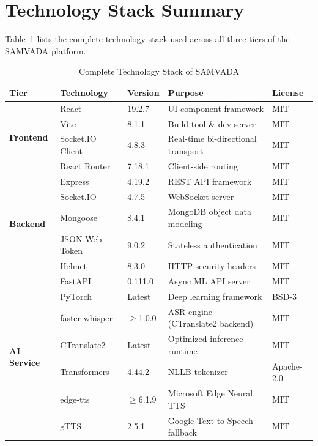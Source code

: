\documentclass[conference]{IEEEtran}
\begin{document}
\appendices

\section{Technology Stack Summary}

Table~\ref{tab:techstack} lists the complete technology stack used across all three tiers of the SAMVADA platform.

\begin{table}[htbp]
\centering
\caption{Complete Technology Stack of SAMVADA}
\label{tab:techstack}
\renewcommand{\arraystretch}{1.2}
{\small
\begin{tabular}{@{} l l l l l @{}}
\toprule
\textbf{Tier} & \textbf{Technology} & \textbf{Version} & \textbf{Purpose} & \textbf{License} \\
\midrule
\multirow{4}{*}{\textbf{Frontend}} 
  & React          & 19.2.7   & UI component framework              & MIT \\
  & Vite           & 8.1.1    & Build tool \& dev server             & MIT \\
  & Socket.IO Client & 4.8.3  & Real-time bi-directional transport   & MIT \\
  & React Router   & 7.18.1   & Client-side routing                  & MIT \\
\midrule
\multirow{5}{*}{\textbf{Backend}}
  & Express        & 4.19.2   & REST API framework                   & MIT \\
  & Socket.IO      & 4.7.5    & WebSocket server                     & MIT \\
  & Mongoose       & 8.4.1    & MongoDB object data modeling          & MIT \\
  & JSON Web Token & 9.0.2    & Stateless authentication             & MIT \\
  & Helmet         & 8.3.0    & HTTP security headers                & MIT \\
\midrule
\multirow{7}{*}{\textbf{AI Service}}
  & FastAPI        & 0.111.0  & Async ML API server                  & MIT \\
  & PyTorch        & Latest   & Deep learning framework              & BSD-3 \\
  & faster-whisper & $\geq$1.0.0 & ASR engine (CTranslate2 backend)  & MIT \\
  & CTranslate2    & Latest   & Optimized inference runtime           & MIT \\
  & Transformers   & 4.44.2   & NLLB tokenizer                       & Apache-2.0 \\
  & edge-tts       & $\geq$6.1.9 & Microsoft Edge Neural TTS         & MIT \\
  & gTTS           & 2.5.1    & Google Text-to-Speech fallback       & MIT \\
\bottomrule
\end{tabular}
}
\end{table}
\end{document}
